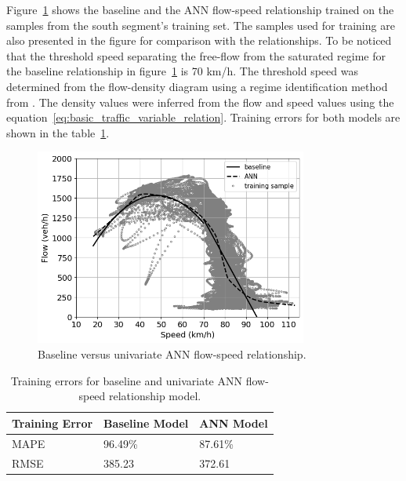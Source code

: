 \documentclass[english]{kththesis}
\begin{document}

Figure~\ref{fig:base_ann_training} shows the baseline and the ANN flow-speed relationship trained on the samples from the south segment's training set. The samples used for training are also presented in the figure for comparison with the relationships.  To be noticed that the threshold speed separating the free-flow from the saturated regime for the baseline relationship in figure~\ref{fig:base_ann_training} is 70 km/h. The threshold speed was determined from the flow-density diagram using a regime identification method from \cite{nielsen_flow-speed_relations}. The density values were inferred from the flow and speed values using the equation~\ref{eq:basic_traffic_variable_relation}. Training errors for both models are shown in the table~\ref{tab:training_errors}.

\begin{figure}[!ht]
    \centering
    \includegraphics[width=0.8\textwidth]{baseline_ann_training.png}
    \caption{Baseline versus univariate ANN flow-speed relationship.}
    \label{fig:base_ann_training}
\end{figure}

\begin{table}[!ht]
\centering
\begin{tabular}{@{}lll@{}}
\toprule
\textbf{Training Error} & \textbf{Baseline Model} & \textbf{ANN Model} \\
\midrule
MAPE          & 96.49\% & 87.61\%    \\
RMSE          & 385.23  & 372.61     \\ 
\bottomrule
\end{tabular}
\caption{Training errors for baseline and univariate ANN flow-speed relationship model.}
\label{tab:training_errors}
\end{table}
\end{document}
